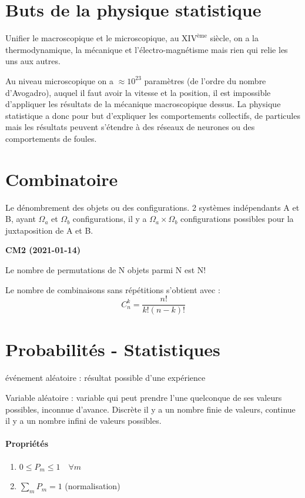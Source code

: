 \documentclass[12pt,a4paper]{report}
\begin{document}
\section{Buts de la physique statistique}
Unifier le macroscopique et le microscopique, au $\text{XIV}^{\text{\`eme}}$ siècle, on a la thermodynamique, la mécanique et l'électro-magnétisme mais rien qui relie les uns aux autres.

Au niveau microscopique on a $\approx 10^{23}$ paramètres (de l'ordre du nombre d'Avogadro), auquel il faut avoir la vitesse et la position, il est impossible d'appliquer les résultats de la mécanique macroscopique dessus.
La physique statistique a donc pour but d'expliquer les comportements collectifs, de particules mais les résultats peuvent s'étendre à des réseaux de neurones ou des comportements de foules.

\section{Combinatoire}
Le dénombrement des objets ou des configurations. 2 systèmes indépendants A et B, ayant $\Omega_a$ et $\Omega_b$ configurations, il y a \(\Omega_a \times \Omega_b\) configurations possibles pour la juxtaposition de A et B.

\begin{center}
\textbf{CM2 (2021-01-14)}
\end{center}

Le nombre de permutations de N objets parmi N est N!

Le nombre de combinaisons sans répétitions s'obtient avec :
\[
	C^k_n = \dfrac{n!}{k!(n-k)!}
\]

\section{Probabilités - Statistiques}

événement aléatoire : résultat possible d'une expérience

Variable aléatoire : variable qui peut prendre l'une quelconque de ses valeurs possibles, inconnue d'avance. Discrète il y a un nombre finie de valeurs, continue il y a un nombre infini de valeurs possibles.

\paragraph{Propriétés}
\begin{enumerate}
	\item \(0 \leq P_m \leq 1 \quad \forall m\)
	\item \(\sum_m P_m = 1\) (normalisation)
\end{enumerate}
\end{document}
